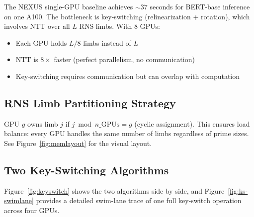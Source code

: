 \documentclass[11pt,letterpaper]{article}
\begin{document}
The NEXUS single-GPU baseline achieves $\sim 37$ seconds for BERT-base inference on one
A100. The bottleneck is key-switching (relinearization + rotation), which involves NTT
over all $L$ RNS limbs. With 8 GPUs:

\begin{itemize}
  \item Each GPU holds $L/8$ limbs instead of $L$
  \item NTT is $8\times$ faster (perfect parallelism, no communication)
  \item Key-switching requires communication but can overlap with computation
\end{itemize}

\subsection{RNS Limb Partitioning Strategy}

GPU $g$ owns limb $j$ if $j \bmod n\_\text{GPUs} = g$ (cyclic assignment). This ensures
load balance: every GPU handles the same number of limbs regardless of prime sizes. See
Figure~\ref{fig:memlayout} for the visual layout.

\subsection{Two Key-Switching Algorithms}

Figure~\ref{fig:keyswitch} shows the two algorithms side by side, and
Figure~\ref{fig:ks-swimlane} provides a detailed swim-lane trace of one
full key-switch operation across four GPUs.
\end{document}

